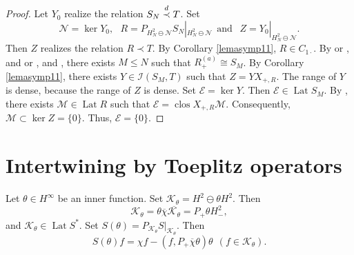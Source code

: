 \documentclass[a4paper,oneside,11pt]{amsart}
\numberwithin{equation}{section}
\theoremstyle{plain}
\theoremstyle{definition}
\begin{document}
\begin{proof} Let $Y_0$ realize the relation $S_N\buildrel d\over\prec T$. Set
\begin{equation*}\mathcal N=\ker Y_0, \ \ \ R=P_{H^2_N\ominus \mathcal N}S_N|_{H^2_N\ominus \mathcal N}
\ \ \text{and } \ \ Z=Y_0|_{H^2_N\ominus \mathcal N}. \end{equation*} 
Then $Z$ realizes the relation $R\prec T$. By Corollary \ref{lemasymp11}, $R\in C_{1\cdot}$. By 
\cite{uchiyama83} or \cite{takahashi84}, and \cite{ker89} or {\cite[Sec. IX.1]{nfbk}}, and
{\cite[Lemma 2.1]{gamalshiftindex}}, there exists $M\leq N$ such that  $R_+^{(a)}\cong S_M$. By Corollary \ref{lemasymp11}, 
 there exists $Y\in\mathcal I(S_M, T)$ such that $Z=YX_{+,R}$. The range of $Y$ is dense, because the range of $Z$ is dense. 
Set $\mathcal E=\ker Y$. Then $\mathcal E\in\operatorname{Lat}S_M$. By \cite{gamal02}, there exists 
$\mathcal M\in\operatorname{Lat}R$ such that $\mathcal E=\operatorname{clos}X_{+,R}\mathcal M$.
Consequently, $\mathcal M\subset\ker Z=\{0\}$. Thus, $\mathcal E=\{0\}$.
\end{proof}


\section{Intertwining by Toeplitz operators}


Let $\theta\in H^\infty$ be an inner function. Set $\mathcal K_\theta=H^2\ominus\theta H^2$. Then 
\begin{equation}\label{30}\mathcal K_\theta=\theta\overline\chi\overline{\mathcal K_\theta}=P_+\theta H^2_-,
\end{equation}
and $\mathcal K_\theta\in\operatorname{Lat}S^*$. 
Set $S(\theta)=P_{\mathcal K_\theta}S|_{\mathcal K_\theta}$.
Then 
\begin{equation}
\label{sstheta}
S(\theta) f =\chi f-(f,P_+\overline\chi\theta)\theta \ \ ( f\in\mathcal K_\theta). 
\end{equation}
\end{document}
